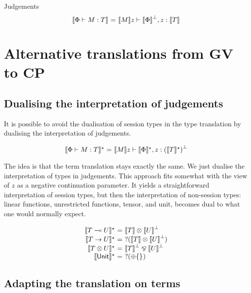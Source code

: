 \documentclass{easychair}
\makeatletter
\newcommand{\ba}{\begin{array}}
\newcommand{\ea}{\end{array}}
\newenvironment{equations}{\[\ba{@{}r@{~}c@{~}l@{}}}{\ea\]}
\newcommand{\key}{\mathsf}
\newcommand{\set}[1]{\{ #1 \}}
\newcommand{\gvtocp}[1]{\llbracket{#1}\rrbracket}
\newcommand{\row}[2]{\set{#1}_{#2}}
\newcommand{\cpj}[2]{{#1} \vdash {#2}}
\newcommand{\gvj}[3]{{#1} \vdash {#2} : {#3}}
\newcommand{\T}{T}
\newcommand{\U}{U}
\newcommand{\gvLinFun}[2]{{#1} \multimap {#2}}
\newcommand{\gvUnFun}[2]{{#1} \to {#2}}
\newcommand{\gvTimes}[2]{{#1} \otimes {#2}}
\newcommand{\gvUnitType}{\key{Unit}}
\newcommand{\cpTimes}[2]{{#1} \otimes {#2}}
\newcommand{\cpPar}[2]{{#1} \mathbin{\bindnasrepma} {#2}}
\newcommand{\cpPlus}[2]{\oplus \row{#1}{#2}}
\newcommand{\cpWhyNot}[1]{?{#1}}
\newcommand{\cpDual}[1]{{#1}^\bot}
\makeatother
\begin{document}
Judgements
\begin{equations}
\gvtocp{\gvj{\Phi}{M}{\T}} &=& \cpj{\gvtocp{M}z}{\cpDual{\gvtocp{\Phi}}, z:\gvtocp{\T}}
\end{equations}

\section{Alternative translations from GV to CP}

\subsection{Dualising the interpretation of judgements}

It is possible to avoid the dualisation of session types in the type
translation by dualising the interpretation of judgements.

\newcommand{\gvtocps}[1]{\gvtocp{#1}^\star}
\newcommand{\gvtocpd}[1]{\gvtocp{#1}^\dagger}

\begin{equations}
\gvtocps{\gvj{\Phi}{M}{\T}} &=& \cpj{\gvtocp{M} z}{\gvtocps{\Phi}, z:\cpDual{(\gvtocps{\T})}}
\end{equations}

The idea is that the term translation stays exactly the same. We just
dualise the interpretation of types in judgements. This approach fits
somewhat with the view of $z$ as a negative continuation parameter. It
yields a straightforward interpretation of session types, but then the
interpretation of non-session types: linear functions, unrestricted
functions, tensor, and unit, becomes dual to what one would normally
expect.

\begin{equations}
\gvtocps{\gvLinFun{\T}{\U}} &=& \cpTimes{\gvtocp{\T}}{\cpDual{\gvtocp{\U}}} \\
\gvtocps{\gvUnFun{\T}{\U}} &=& \cpWhyNot{(\cpTimes{\gvtocp{\T}}{\cpDual{\gvtocp{\U}}})} \\
\gvtocps{\gvTimes{\T}{\U}} &=& \cpPar{\cpDual{\gvtocp{\T}}}{\cpDual{\gvtocp{\U}}} \\
\gvtocps{\gvUnitType} &=& \cpWhyNot{(\cpPlus{}{})} \\
\end{equations}

\subsection{Adapting the translation on terms}
\end{document}

